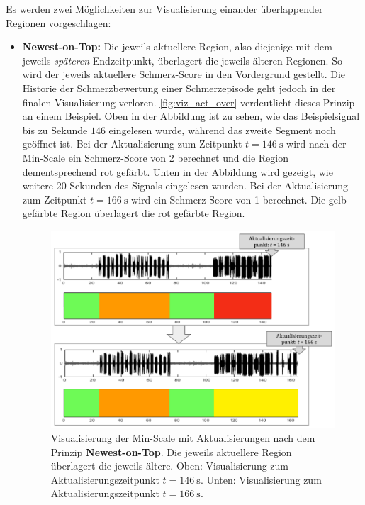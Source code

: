 Es werden zwei Möglichkeiten zur Visualisierung einander überlappender Regionen vorgeschlagen:

\begin{itemize}
\item \textbf{Newest-on-Top: } Die jeweils \glqq aktuellere\grqq{} Region, also diejenige mit dem jeweils \emph{späteren} Endzeitpunkt, überlagert die jeweils \glqq älteren\grqq{} Regionen. So wird der jeweils aktuellere Schmerz-Score in den Vordergrund gestellt. Die Historie der Schmerzbewertung einer Schmerzepisode geht jedoch in der finalen Visualisierung verloren. \autoref{fig:viz_act_over} verdeutlicht dieses Prinzip an einem Beispiel. Oben in der Abbildung ist zu sehen, wie das Beispielsignal bis zu Sekunde $146$ eingelesen wurde, während das zweite Segment noch geöffnet ist. Bei der Aktualisierung zum Zeitpunkt $t=\SI{146}{\second}$ wird nach der Min-Scale ein Schmerz-Score von 2 berechnet und die Region dementsprechend rot gefärbt. Unten in der Abbildung wird gezeigt, wie weitere 20 Sekunden des Signals eingelesen wurden. Bei der Aktualisierung zum Zeitpunkt $t=\SI{166}{\second}$ wird ein Schmerz-Score von 1 berechnet. Die gelb gefärbte Region überlagert die rot gefärbte Region.

\begin{figure}[h]
	\centering
	\includegraphics[width=1\textwidth]{bilder/viz_act_over_03.png}
	\caption[Visualisierung bei Aktualisierungen nach dem Prinzip Newest-on-Top]{Visualisierung der Min-Scale mit Aktualisierungen nach dem Prinzip \textbf{Newest-on-Top}. Die jeweils \glqq aktuellere\grqq{} Region überlagert die jeweils \glqq ältere\grqq{}. Oben: Visualisierung zum Aktualisierungszeitpunkt $t=\SI{146}{\second}$. Unten: Visualisierung zum Aktualisierungszeitpunkt $t=\SI{166}{\second}$.}
	\label{fig:viz_act_over}
\end{figure}


\end{itemize}
